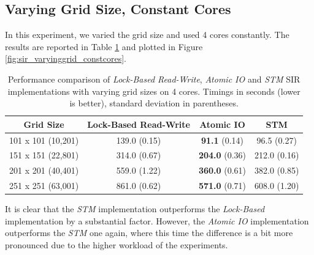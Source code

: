 \subsection{Varying Grid Size, Constant Cores}
In this experiment, we varied the grid size and used 4 cores constantly. The results are reported in Table \ref{tab:sir_varyinggrid_constcores} and plotted in Figure \ref{fig:sir_varyinggrid_constcores}.

\begin{table}
	\centering
  	\begin{tabular}{ c || c | c | c  }
        Grid Size           & Lock-Based Read-Write & Atomic IO              & STM            \\ \hline \hline 
   		101 x 101 (10,201)  & 139.0 (0.15)          & \textbf{91.1} (0.14)   & 96.5 (0.27)    \\ \hline
   		151 x 151 (22,801)  & 314.0 (0.67)          & \textbf{204.0} (0.36)  & 212.0 (0.16)   \\ \hline
   		201 x 201 (40,401)  & 559.0 (1.22)          & \textbf{360.0} (0.61)  & 382.0 (0.85)   \\ \hline
   		251 x 251 (63,001)  & 861.0 (0.62)          & \textbf{571.0} (0.71)  & 608.0 (1.20)   \\ \hline \hline
  	\end{tabular}

  	\caption[Performance comparison of \textit{Lock-Based Read-Write}, \textit{Atomic IO} and \textit{STM} SIR implementations with varying grid sizes on 4 cores]{Performance comparison of \textit{Lock-Based Read-Write}, \textit{Atomic IO} and \textit{STM} SIR implementations with varying grid sizes on 4 cores. Timings in seconds (lower is better), standard deviation in parentheses.}
	\label{tab:sir_varyinggrid_constcores} 
\end{table}

It is clear that the \textit{STM} implementation outperforms the \textit{Lock-Based} implementation by a substantial factor. However, the \textit{Atomic IO} implementation outperforms the \textit{STM} one again, where this time the difference is a bit more pronounced due to the higher workload of the experiments. 

